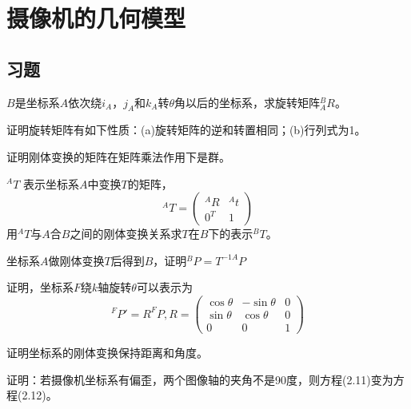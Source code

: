 
\section{摄像机的几何模型}

\subsection{习题}

\begin{problem}
    $B$是坐标系$A$依次绕$i_A$，$j_A$和$k_A$转$\theta$角以后的坐标系，求旋转矩阵$_{A}^{B}R$。 
\end{problem}

\begin{problem}
    证明旋转矩阵有如下性质：(a)旋转矩阵的逆和转置相同；(b)行列式为1。
\end{problem}

\begin{problem}
    证明刚体变换的矩阵在矩阵乘法作用下是群。 
\end{problem}

\begin{problem}
    $^{A}T$ 表示坐标系$A$中变换$T$的矩阵，
    $$^{A}T =\begin{pmatrix}
        ^{A}R & ^{A}t \\
        0^T & 1
       \end{pmatrix}$$
    用$^{A}T$与$A$合$B$之间的刚体变换关系求$T$在$B$下的表示$^{B}T$。
\end{problem}

\begin{problem}
    坐标系$A$做刚体变换$T$后得到$B$，证明$^{B}P=T^{-1A}P$
\end{problem}

\begin{problem}
    证明，坐标系$F$绕$k$轴旋转$\theta$可以表示为
    $$^{F}P'=R^FP, R=\begin{pmatrix}
        \cos {\theta } & -\sin {\theta } & 0 \\
        \sin {\theta } & \cos {\theta } & 0\\
        0 & 0 & 1
       \end{pmatrix}$$
\end{problem}

\begin{problem}
    证明坐标系的刚体变换保持距离和角度。 
\end{problem}

\begin{problem}
    证明：若摄像机坐标系有偏歪，两个图像轴的夹角不是90度，则方程(2.11)变为方程(2.12)。
\end{problem}

